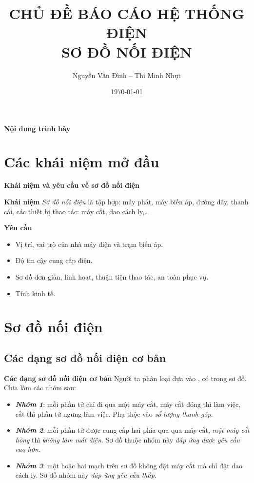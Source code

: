 \documentclass{beamer}
\author[SƠ ĐỒ NỐI ĐIỆN]{Nguyễn Văn Đình -- Thi Minh Nhựt}
\title{\textbf{CHỦ ĐỀ BÁO CÁO HỆ THỐNG ĐIỆN\hspace{.1cm}\\SƠ ĐỒ NỐI ĐIỆN}}
\date{\today}
\begin{document}
\titlepageframe

\begin{tframe}{\textbf{Nội dung trình bày}}
\tableofcontents
\end{tframe}
\section{Các khái niệm mở đầu}
\begin{frame}{\textbf{Khái niệm và yêu cầu về sơ đồ nối điện}}
\begin{block}{\textbf{Khái niệm}}
\emph{Sơ đồ nối điện} là tập hợp: máy phát, máy biến áp, đường dây, thanh cái, các thiết bị thao tác: máy cắt, dao cách ly,\ldots
\end{block}

\begin{block}{\textbf{Yêu cầu}}
\begin{itemize}
\item Vị trí, vai trò của nhà máy điện và trạm biến áp.
\item Độ tin cậy cung cấp điện.
\item Sơ đồ đơn giản, linh hoạt, thuận tiện thao tác, an toàn phục vụ.
\item Tính kinh tế.
\end{itemize}
\end{block}
\end{frame}

\section{Sơ đồ nối điện}
\subsection{Các dạng sơ đồ nối điện cơ bản}
\begin{tframe}{\textbf{Các dạng sơ đồ nối điện cơ bản}}
Người ta phân loại dựa vào ,  có trong sơ đồ. Chia làm các nhóm sau:
\begin{itemize}
\item \textbf{\emph{Nhóm 1}}: mỗi phần tử \alert{chỉ đi qua một máy cắt}, máy cắt đóng thì làm việc, cắt thì phần tử ngưng làm việc. Phụ thộc vào \emph{số lượng thanh góp}.
\item \textbf{\emph{Nhóm 2}}: mỗi phần tử được cung cấp hai phía \alert{qua qua máy cắt}, \emph{một máy cắt hỏng} thì \emph{không làm mất điện}. Sơ đồ thuộc nhóm này \emph{đáp ứng được yêu cầu cao hơn}.
\item \textbf{\emph{Nhóm 3}}: \alert{một hoặc hai mạch} trên sơ đồ \alert{không đặt máy cắt} mà \alert{chỉ đặt dao cách ly}. Sơ đồ nhóm này \emph{đáp ứng yêu cầu thấp}.
\end{itemize}
\end{tframe}
\end{document}
